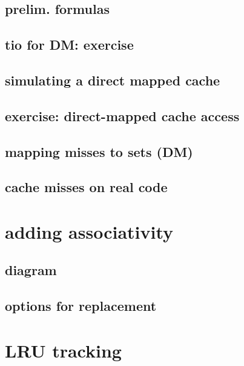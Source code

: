 \subsection{prelim. formulas}


\subsection{tio for DM: exercise}


\subsection{simulating a direct mapped cache}


\subsection{exercise: direct-mapped cache access}


\subsection{mapping misses to sets (DM)}


\subsection{cache misses on real code}


\section{adding associativity}


\subsection{diagram}


\subsection{options for replacement}


\section{LRU tracking}



